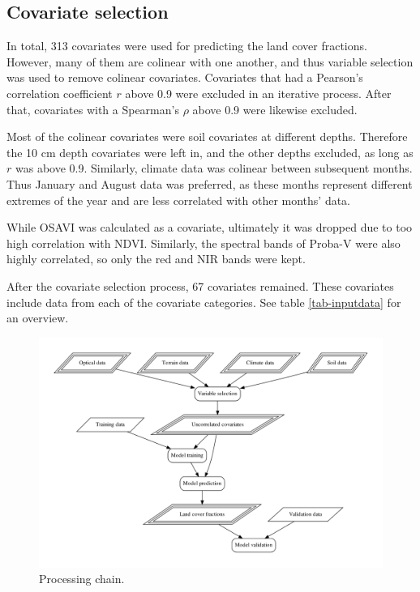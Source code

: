 \documentclass[a4paper,10pt]{article}
\begin{document}
\subsection{Covariate selection}
\label{sec-covariate-selection}

In total, 313 covariates were used for predicting the land cover fractions.
However, many of them are colinear with one another, and thus variable selection was used to remove colinear covariates.
Covariates that had a Pearson's correlation coefficient $r$ above 0.9 were excluded in an iterative process.
After that, covariates with a Spearman's $\rho$ above 0.9 were likewise excluded.

Most of the colinear covariates were soil covariates at different depths.
Therefore the 10 cm depth covariates were left in, and the other depths excluded, as long as $r$ was above 0.9.
Similarly, climate data was colinear between subsequent months. Thus January and August data was preferred, as these months represent different extremes of the year and are less correlated with other months' data.

While \ac{OSAVI} was calculated as a covariate, ultimately it was dropped due to too high correlation with \ac{NDVI}.
Similarly, the spectral bands of Proba-V were also highly correlated, so only the red and \ac{NIR} bands were kept.

After the covariate selection process, 67 covariates remained.
These covariates include data from each of the covariate categories.
See table \ref{tab-inputdata} for an overview.


\begin{figure}
 \includegraphics[width=\textwidth]{article-figures/flowcharts/processing}
 \caption{Processing chain.}
 \label{fig-processing}
\end{figure}
\end{document}
